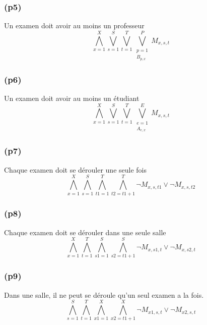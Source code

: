 \documentclass[a4paper,11pt]{article}
\begin{document}
\subsubsection{(p5)}
Un examen doit avoir au moins un professeur
\begin{displaymath}
\bigwedge\limits_{x=1}^{X}\bigvee\limits_{s=1}^{S}\bigvee\limits_{t=1}^{T}\bigvee\limits_{\substack{p=1 \\ B_{p,x}}}^{P} M_{x, s, t}
\end{displaymath}

\subsubsection{(p6)}
Un examen doit avoir au moins un étudiant
\begin{displaymath}
\bigwedge\limits_{x=1}^{X}\bigvee\limits_{s=1}^{S}\bigvee\limits_{t=1}^{T}\bigvee\limits_{\substack{e=1 \\ A_{e,x}}}^{E} M_{x, s, t}
\end{displaymath}

\subsubsection{(p7)}
Chaque examen doit se dérouler une seule fois
\begin{displaymath}
\bigwedge\limits_{x=1}^{X}\bigwedge\limits_{s=1}^{S}\bigwedge\limits_{t1=1}^{T}\bigwedge\limits_{t2=t1+1}^{T} \neg M_{x, s, t1} \vee \neg M_{x, s, t2}
\end{displaymath}

\subsubsection{(p8)}
Chaque examen doit se dérouler dans une seule salle
\begin{displaymath}
\bigwedge\limits_{x=1}^{X}\bigwedge\limits_{t=1}^{T}\bigwedge\limits_{s1=1}^{S}\bigwedge\limits_{s2=t1+1}^{S} \neg M_{x, s1, t} \vee \neg M_{x, s2, t}
\end{displaymath}

\subsubsection{(p9)}
Dans une salle, il ne peut se déroule qu'un seul examen a la fois.
\begin{displaymath}
\bigwedge\limits_{s=1}^{S}\bigwedge\limits_{t=1}^{T}\bigwedge\limits_{x1=1}^{X}\bigwedge\limits_{x2=t1+1}^{X} \neg M_{x1, s, t} \vee \neg M_{x2, s, t}
\end{displaymath}
\end{document}
